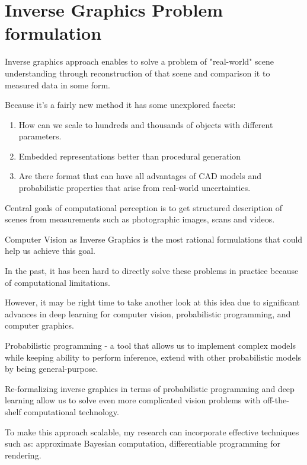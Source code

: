 \section{Inverse Graphics Problem formulation}

\cite{rezende2016unsupervised,eslami2016attend,kulkarni2015deep,wu20153d,izadinia2017im2cad}

Inverse graphics approach enables to solve a problem of "real-world" scene understanding through reconstruction of that scene and comparison it to measured data in some form.

Because it's a fairly new method it has some unexplored facets:
\begin{enumerate}
    \item How can we scale to hundreds and thousands of objects with different parameters.
    \item Embedded representations better than procedural generation
    \item Are there format that can have all advantages of CAD models and probabilistic properties that arise from real-world uncertainties.
\end{enumerate}

Central goals of computational perception is to get structured description of scenes from measurements such as photographic images, scans and videos.

Computer Vision as Inverse Graphics is the most rational formulations that could help us achieve this goal.

In the past, it has been hard to directly solve these problems in practice because of computational limitations.

However, it may be right time to take another look at this idea due to significant advances in deep learning for computer vision, probabilistic programming, and computer graphics.

Probabilistic programming - a tool that allows us to implement complex models while keeping ability to perform inference, extend with other probabilistic models by being general-purpose.

Re-formalizing inverse graphics in terms of probabilistic programming and deep learning allow us to solve even more complicated vision problems with off-the-shelf computational technology.

To make this approach scalable, my research can incorporate effective techniques such as: approximate Bayesian computation, differentiable programming for rendering.

